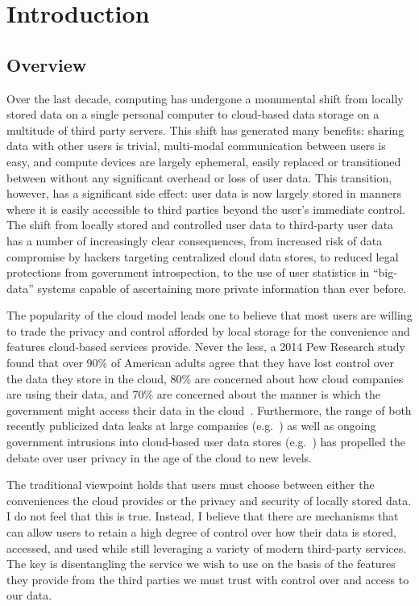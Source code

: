 \chapter{Introduction}
\label{chap:intro}



\section{Overview}

Over the last decade, computing has undergone a monumental shift from
locally stored data on a single personal computer to cloud-based data
storage on a multitude of third party servers. This shift has
generated many benefits: sharing data with other users is trivial,
multi-modal communication between users is easy, and compute devices
are largely ephemeral, easily replaced or transitioned between without
any significant overhead or loss of user data. This transition,
however, has a significant side effect: user data is now largely
stored in manners where it is easily accessible to third parties
beyond the user's immediate control. The shift from locally stored and
controlled user data to third-party user data has a number of
increasingly clear consequences, from increased risk of data
compromise by hackers targeting centralized cloud data stores, to
reduced legal protections from government introspection, to the use of
user statistics in ``big-data'' systems capable of ascertaining more
private information than ever before.

The popularity of the cloud model leads one to believe that most users
are willing to trade the privacy and control afforded by local storage
for the convenience and features cloud-based services provide. Never
the less, a 2014 Pew Research study found that over 90\% of American
adults agree that they have lost control over the data they store in
the cloud, 80\% are concerned about how cloud companies are using
their data, and 70\% are concerned about the manner is which the
government might access their data in the
cloud~\cite{pew-privsec14}. Furthermore, the range of both recently
publicized data leaks at large companies
(e.g.~\cite{apple-icloudleak}) as well as ongoing government
intrusions into cloud-based user data stores
(e.g.~\cite{GreenwaldPrism}) has propelled the debate over user
privacy in the age of the cloud to new levels.

The traditional viewpoint holds that users must choose between either
the conveniences the cloud provides or the privacy and security of
locally stored data. I do not feel that this is true. Instead, I
believe that there are mechanisms that can allow users to retain a
high degree of control over how their data is stored, accessed, and
used while still leveraging a variety of modern third-party
services. The key is disentangling the service we wish to use on the
basis of the features they provide from the third parties we must
trust with control over and access to our data.

